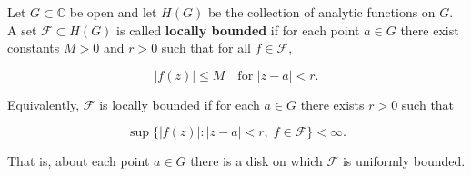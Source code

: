 Let $G \subset \mathbb{C}$ be open and let $H(G)$ be the collection of analytic functions on $G$. A set $\mathcal{F} \subset H(G)$ is called \textbf{locally bounded} if for each point $a \in G$ there exist constants $M > 0$ and $r > 0$ such that for all $f \in \mathcal{F}$,

$$|f(z)| \leq M \quad \text{for } |z-a| < r.$$

Equivalently, $\mathcal{F}$ is locally bounded if for each $a \in G$ there exists $r > 0$ such that

$$\sup \{|f(z)| : |z-a| < r,\; f \in \mathcal{F}\} < \infty.$$

That is, about each point $a \in G$ there is a disk on which $\mathcal{F}$ is uniformly bounded.
